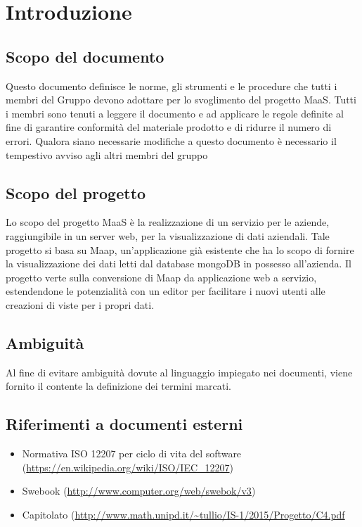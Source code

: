 \section{Introduzione}
\subsection{Scopo del documento}
Questo documento definisce le norme, gli strumenti e le procedure che tutti i membri del Gruppo devono adottare per lo svoglimento del progetto MaaS. Tutti i membri sono tenuti a leggere il documento e ad applicare le regole definite al fine di garantire conformità del materiale prodotto e di ridurre il numero di errori. Qualora siano necessarie modifiche a questo documento è necessario il tempestivo avviso agli altri membri del gruppo

\subsection{Scopo del progetto}
Lo scopo del progetto MaaS è la realizzazione di un servizio per le aziende, raggiungibile in un server web, per la visualizzazione di dati aziendali. Tale progetto si basa su Maap, un'applicazione già esistente che ha lo scopo di fornire la visualizzazione dei dati letti dal database mongoDB in possesso all'azienda. Il progetto verte sulla conversione di Maap da applicazione web a servizio, estendendone le potenzialità con un editor per facilitare i nuovi utenti alle creazioni di viste per i propri dati.

\subsection{Ambiguit\`a}
Al fine di evitare ambiguità dovute al linguaggio impiegato nei documenti, viene fornito il \Glossario contente la definizione dei termini marcati.

\subsection{Riferimenti a documenti esterni}
\begin{itemize}
\item Normativa ISO 12207 per ciclo di vita del software (\url{https://en.wikipedia.org/wiki/ISO/IEC_12207})
\item Swebook (\url{http://www.computer.org/web/swebok/v3})
\item Capitolato (\url{http://www.math.unipd.it/~tullio/IS-1/2015/Progetto/C4.pdf}
  \end{itemize}
